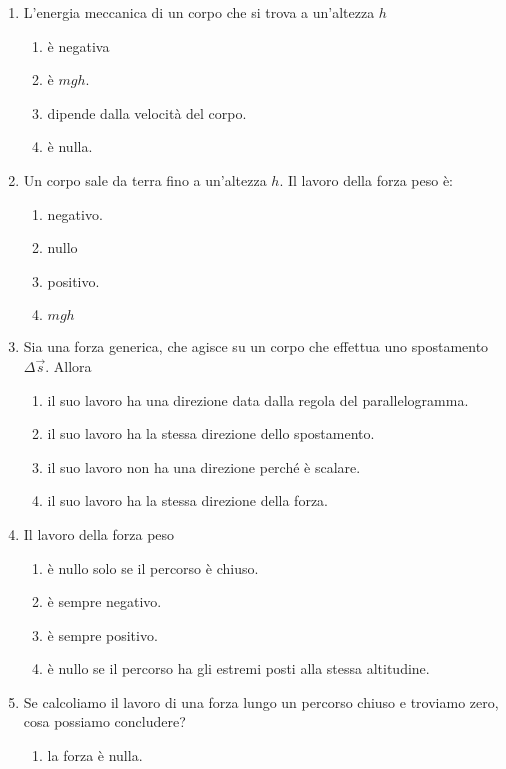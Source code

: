\documentclass{article}
\begin{document}
\begin{enumerate}
  \item L'energia meccanica di un corpo che si trova a un'altezza $h$
  \begin{enumerate}[label=\Alph*.]
    \item è negativa
    \item è $mgh$.
    \item dipende dalla velocità del corpo.
    \item è nulla.
  \end{enumerate}
  \item Un corpo sale da terra fino a un'altezza $h$. Il lavoro della forza peso è:
  \begin{enumerate}[label=\Alph*.]
    \item negativo.
    \item nullo
    \item positivo.
    \item $mgh$
  \end{enumerate}
  \item Sia  una forza generica, che agisce su un corpo che effettua uno spostamento $\Delta \vec{s}$. Allora
  \begin{enumerate}[label=\Alph*.]
    \item il suo lavoro ha una direzione data dalla regola del parallelogramma.
    \item il suo lavoro ha la stessa direzione dello spostamento.
    \item il suo lavoro non ha una direzione perché è scalare.
    \item il suo lavoro ha la stessa direzione della forza.
  \end{enumerate}
  \item Il lavoro della forza peso
  \begin{enumerate}[label=\Alph*.]
    \item è nullo solo se il percorso è chiuso.
    \item è sempre negativo.
    \item è sempre positivo.
    \item è nullo se il percorso ha gli estremi posti alla stessa altitudine.
  \end{enumerate}
  \item Se calcoliamo il lavoro di una forza lungo un percorso chiuso e troviamo zero, cosa possiamo concludere?
  \begin{enumerate}[label=\Alph*.]
    \item la forza è nulla.

\end{enumerate}
\end{enumerate}
\end{document}

